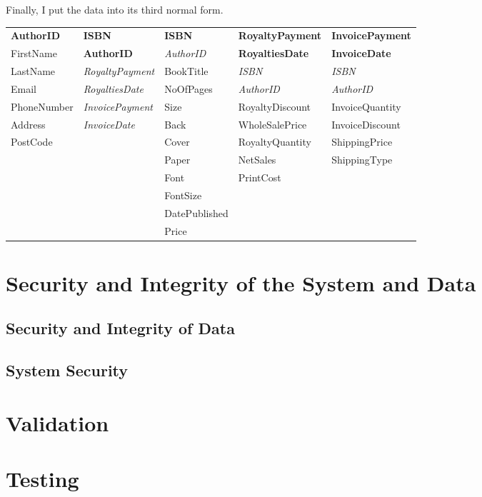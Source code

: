 Finally, I put the data into its third normal form.

\begin{tabular}{|p{2.5cm}|p{2.5cm}|p{2.5cm}|p{2.5cm}|p{2.5cm}|}
    \hline
    \textbf{AuthorID} & \textbf{ISBN} & \textbf{ISBN} & \textbf{RoyaltyPayment} & \textbf{InvoicePayment} \\
    FirstName & \textbf{AuthorID} & \emph{AuthorID} & \textbf{RoyaltiesDate} & \textbf{InvoiceDate} \\
    LastName & \emph{RoyaltyPayment} & BookTitle & \emph{ISBN} & \emph{ISBN} \\
    Email  & \emph{RoyaltiesDate} & NoOfPages & \emph{AuthorID} & \emph{AuthorID} \\
    PhoneNumber & \emph{InvoicePayment} & Size & RoyaltyDiscount & InvoiceQuantity \\
    Address & \emph{InvoiceDate} & Back & WholeSalePrice & InvoiceDiscount \\
    PostCode & & Cover & RoyaltyQuantity & ShippingPrice \\
    & & Paper & NetSales & ShippingType \\
    & & Font & PrintCost & \\
    & & FontSize & &\\
    & & DatePublished & & \\
    & & Price & & \\
    \hline
\end{tabular}

\section{Security and Integrity of the System and Data}

\subsection{Security and Integrity of Data}

\subsection{System Security}

\section{Validation}

\section{Testing}

